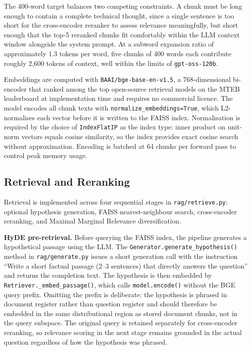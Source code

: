 The 400-word target balances two competing constraints. A chunk must be long enough to contain a complete technical thought, since a single sentence is too short for the cross-encoder reranker to assess relevance meaningfully, but short enough that the top-5 reranked chunks fit comfortably within the LLM context window alongside the system prompt. At a subword expansion ratio of approximately 1.3 tokens per word, five chunks of 400 words each contribute roughly 2,600 tokens of context, well within the limits of \texttt{gpt-oss-120b}.

Embeddings are computed with \texttt{BAAI/bge-base-en-v1.5}, a 768-dimensional bi-encoder that ranked among the top open-source retrieval models on the MTEB leaderboard at implementation time and requires no commercial licence. The model encodes all chunk texts with \texttt{normalize\_embeddings=True}, which L2-normalises each vector before it is written to the FAISS index. Normalisation is required by the choice of \texttt{IndexFlatIP} as the index type: inner product on unit-norm vectors equals cosine similarity, so the index provides exact cosine search without approximation. Encoding is batched at 64 chunks per forward pass to control peak memory usage.

\subsection{Retrieval and Reranking}

Retrieval is implemented across four sequential stages in \texttt{rag/retrieve.py}: optional hypothesis generation, FAISS nearest-neighbour search, cross-encoder reranking, and Maximal Marginal Relevance diversification.

\textbf{HyDE pre-retrieval.} Before querying the FAISS index, the pipeline generates a hypothetical passage using the LLM. The \texttt{Generator.generate\_hypothesis()} method in \texttt{rag/generate.py} issues a short generation call with the instruction ``Write a short factual passage (2--3 sentences) that directly answers the question'' and returns the completion text. The hypothesis is then embedded by \texttt{Retriever.\_embed\_passage()}, which calls \texttt{model.encode()} without the BGE query prefix. Omitting the prefix is deliberate: the hypothesis is phrased in document register rather than question register and should therefore be embedded in the same distributional region as stored document chunks, not in the query subspace. The original query is retained separately for cross-encoder reranking, so relevance scoring in the next stage remains grounded in the actual question regardless of how the hypothesis was phrased.

